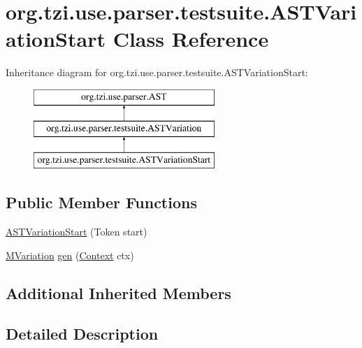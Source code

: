 \hypertarget{classorg_1_1tzi_1_1use_1_1parser_1_1testsuite_1_1_a_s_t_variation_start}{\section{org.\-tzi.\-use.\-parser.\-testsuite.\-A\-S\-T\-Variation\-Start Class Reference}
\label{classorg_1_1tzi_1_1use_1_1parser_1_1testsuite_1_1_a_s_t_variation_start}
}
Inheritance diagram for org.\-tzi.\-use.\-parser.\-testsuite.\-A\-S\-T\-Variation\-Start\-:\begin{figure}[H]
\begin{center}
\leavevmode
\includegraphics[height=3.000000cm]{classorg_1_1tzi_1_1use_1_1parser_1_1testsuite_1_1_a_s_t_variation_start}
\end{center}
\end{figure}
\subsection*{Public Member Functions}
\begin{DoxyCompactItemize}
\item 
\hyperlink{classorg_1_1tzi_1_1use_1_1parser_1_1testsuite_1_1_a_s_t_variation_start_afa8254ee4f96375b125642eeea8f3a6d}{A\-S\-T\-Variation\-Start} (Token start)
\item 
\hyperlink{classorg_1_1tzi_1_1use_1_1uml_1_1sys_1_1testsuite_1_1_m_variation}{M\-Variation} \hyperlink{classorg_1_1tzi_1_1use_1_1parser_1_1testsuite_1_1_a_s_t_variation_start_a420ab6bb8086ec26b6518354d71bf434}{gen} (\hyperlink{classorg_1_1tzi_1_1use_1_1parser_1_1_context}{Context} ctx)
\end{DoxyCompactItemize}
\subsection*{Additional Inherited Members}


\subsection{Detailed Description}


